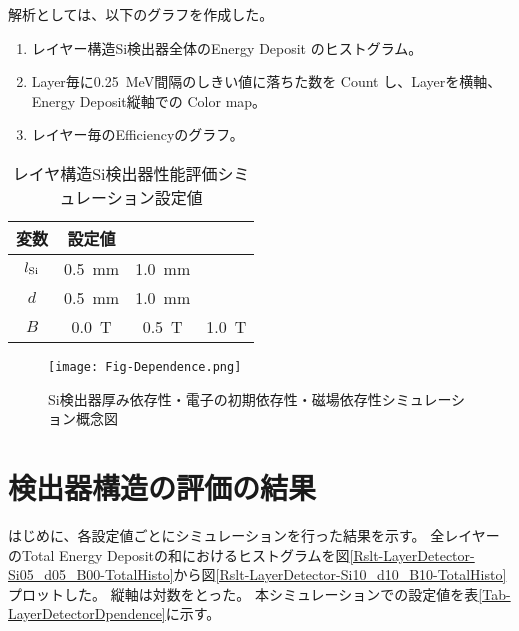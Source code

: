 \documentclass[a4paper,10pt]{jreport}
\begin{document}
解析としては、以下のグラフを作成した。

\begin{enumerate}
	\item レイヤー構造Si検出器全体のEnergy Deposit のヒストグラム。
	\item  Layer毎に\SI{0.25}{MeV}間隔のしきい値に落ちた数を Count し、Layerを横軸、Energy Deposit縦軸での Color map。
	\item レイヤー毎のEfficiencyのグラフ。
\end{enumerate}

\begin{table}[H] 
	\center
	\caption{レイヤ構造Si検出器性能評価シミュレーション設定値} \label{Tab-Dpendence}
	\begin{tabular}{cccc}
		\hline
		変数 & 設定値  \\
		\hline
		$l_{\rm{Si}}$ &  \SI{0.5}{mm} & \SI{1.0}{mm} & \\
		$d$ & \SI{0.5}{mm} & \SI{1.0}{mm} & \\
		$B$ & \SI{0.0}{T} & \SI{0.5}{T} & \SI{1.0}{T} \\
		\hline
	\end{tabular}
\end{table}

\begin{figure}[H]
	\center
	\texttt{[image: Fig-Dependence.png]}
	\caption{Si検出器厚み依存性・電子の初期依存性・磁場依存性シミュレーション概念図} \label{Fig-Dependence}
\end{figure}




\section{検出器構造の評価の結果}

はじめに、各設定値ごとにシミュレーションを行った結果を示す。
全レイヤーのTotal Energy Depositの和におけるヒストグラムを図\ref{Rslt-LayerDetector-Si05_d05_B00-TotalHisto}から図\ref{Rslt-LayerDetector-Si10_d10_B10-TotalHisto}プロットした。
縦軸は対数をとった。
本シミュレーションでの設定値を表\ref{Tab-LayerDetectorDpendence}に示す。
\end{document}
